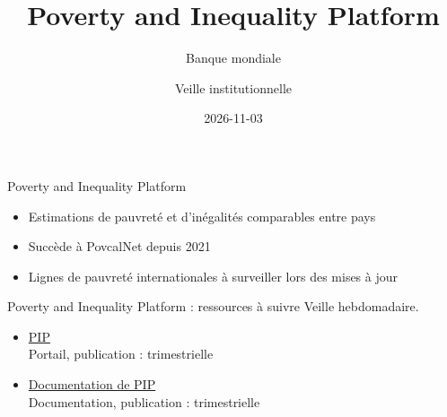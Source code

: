 \documentclass[aspectratio=169,11pt]{beamer}
\title{Poverty and Inequality Platform}
\subtitle{Banque mondiale}
\author{Veille institutionnelle}
\date{2026-11-03}
\begin{document}
\begin{frame}\titlepage\end{frame}

\begin{frame}{Poverty and Inequality Platform}
\begin{itemize}
\item Estimations de pauvreté et d'inégalités comparables entre pays
\item Succède à PovcalNet depuis 2021
\item Lignes de pauvreté internationales à surveiller lors des mises à jour
\end{itemize}
\end{frame}

\begin{frame}{Poverty and Inequality Platform : ressources à suivre}
\small
Veille hebdomadaire.
\begin{itemize}
\item \href{https://pip.worldbank.org}{PIP}\\{\footnotesize Portail, publication : trimestrielle}
\item \href{https://pip.worldbank.org/documentation}{Documentation de PIP}\\{\footnotesize Documentation, publication : trimestrielle}
\end{itemize}
\end{frame}
\end{document}
